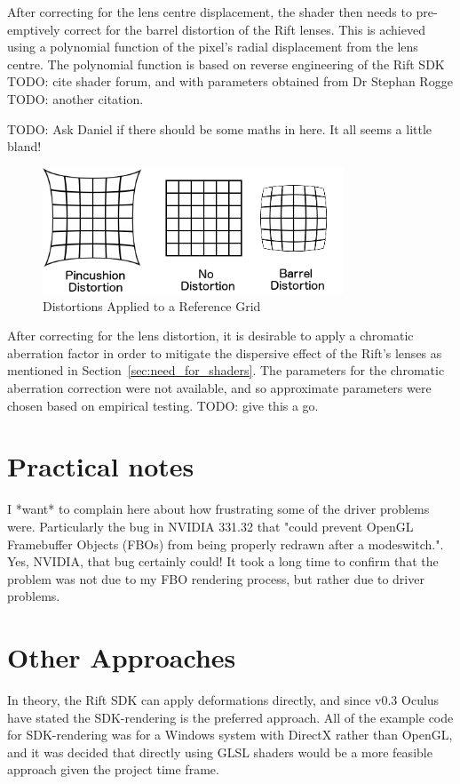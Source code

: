 \documentclass[MSc,paper=a4,pagesize=auto]{icldt}
\begin{document}
After correcting for the lens centre displacement, the shader then needs to pre-emptively correct for the barrel distortion of the Rift lenses. This is achieved using a polynomial function of the pixel's radial displacement from the lens centre. The polynomial function is based on reverse engineering of the Rift SDK TODO: cite shader forum, and with parameters obtained from Dr Stephan Rogge TODO: another citation. 

TODO: Ask Daniel if there should be some maths in here. It all seems a little bland!

\begin{figure}[htbp!]
    \centering
    \includegraphics[width=0.8\textwidth]{resources/distortions}
    \caption{Distortions Applied to a Reference Grid}
    \label{fig:distortions}
\end{figure}

After correcting for the lens distortion, it is desirable to apply a chromatic aberration factor in order to mitigate the dispersive effect of the Rift's lenses as mentioned in Section~\ref{sec:need_for_shaders}. The parameters for the chromatic aberration correction were not available, and so approximate parameters were chosen based on empirical testing. TODO: give this a go. 

\section{Practical notes}
I *want* to complain here about how frustrating some of the driver problems were. Particularly the bug in NVIDIA 331.32 that "could prevent OpenGL Framebuffer Objects (FBOs) from being properly redrawn after a modeswitch.". Yes, NVIDIA, that bug certainly could! It took a long time to confirm that the problem was not due to my FBO rendering process, but rather due to driver problems.


\section{Other Approaches}
In theory, the Rift SDK can apply deformations directly, and since v0.3 Oculus have stated the SDK-rendering is the preferred approach. All of the example code for SDK-rendering was for a Windows system with DirectX rather than OpenGL, and it was decided that directly using GLSL shaders would be a more feasible approach given the project time frame. 
\end{document}
